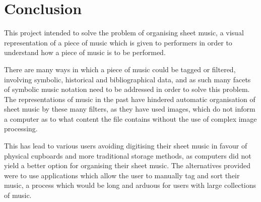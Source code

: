 \section{Conclusion}
This project intended to solve the problem of organising sheet music, a visual representation of a piece of music which is given to performers in order to understand how a piece of music is to be performed.

There are many ways in which a piece of music could be tagged or filtered, involving symbolic, historical and bibliographical data, and as such many facets of symbolic music notation need to be addressed in order to solve this problem. The representations of music in the past have hindered automatic organisation of sheet music by these many filters, as they have used images, which do not inform a computer as to what content the file contains without the use of complex image processing.

This has lead to various users avoiding digitising their sheet music in favour of physical cupboards and more traditional storage methods, as computers did not yield a better option for organising their sheet music. The alternatives provided were to use applications which allow the user to manually tag and sort their music, a process which would be long and arduous for users with large collections of music.

